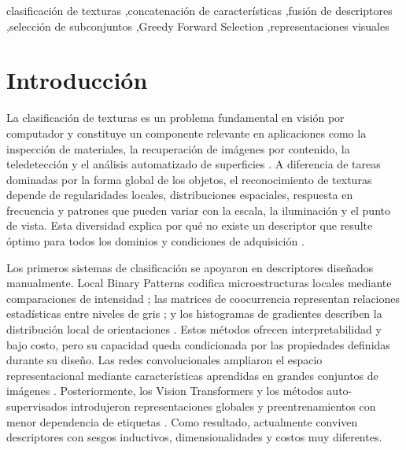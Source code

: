 \documentclass[a4paper,fleqn]{cas-sc}
\begin{document}
\begin{keywords}
clasificación de texturas \sep concatenación de características \sep fusión de descriptores \sep selección de subconjuntos \sep Greedy Forward Selection \sep representaciones visuales
\end{keywords}

\maketitle

\section{Introducción}\label{sec:introduccion}

La clasificación de texturas es un problema fundamental en visión por computador y constituye un componente relevante en aplicaciones como la inspección de materiales, la recuperación de imágenes por contenido, la teledetección y el análisis automatizado de superficies \citep{bel2022texture}. A diferencia de tareas dominadas por la forma global de los objetos, el reconocimiento de texturas depende de regularidades locales, distribuciones espaciales, respuesta en frecuencia y patrones que pueden variar con la escala, la iluminación y el punto de vista. Esta diversidad explica por qué no existe un descriptor que resulte óptimo para todos los dominios y condiciones de adquisición \citep{cimpoi2014dtd,cimpoi2016fisher}.

Los primeros sistemas de clasificación se apoyaron en descriptores diseñados manualmente. Local Binary Patterns codifica microestructuras locales mediante comparaciones de intensidad \citep{ojala2002lbp}; las matrices de coocurrencia representan relaciones estadísticas entre niveles de gris \citep{haralick1979glcm}; y los histogramas de gradientes describen la distribución local de orientaciones \citep{dalal2005hog}. Estos métodos ofrecen interpretabilidad y bajo costo, pero su capacidad queda condicionada por las propiedades definidas durante su diseño. Las redes convolucionales ampliaron el espacio representacional mediante características aprendidas en grandes conjuntos de imágenes \citep{he2016resnet,tan2019efficientnet}. Posteriormente, los Vision Transformers y los métodos auto-supervisados introdujeron representaciones globales y preentrenamientos con menor dependencia de etiquetas \citep{dosovitskiy2021vit,liu2021swin,caron2021dino,oquab2024dinov2}. Como resultado, actualmente conviven descriptores con sesgos inductivos, dimensionalidades y costos muy diferentes.
\end{document}
